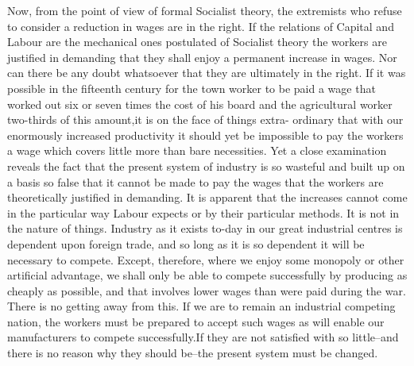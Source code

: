 \documentclass{book}
\begin{document}
Now, from the point of view of formal Socialist theory, the extremists who refuse to consider a reduction in wages are in the right. If the relations of Capital and Labour are the mechanical ones postulated of Socialist theory the workers are justified in demanding that they shall enjoy a permanent increase in wages. Nor can there be any doubt whatsoever that they are ultimately in the right. If it was possible in the fifteenth century for the town worker to be paid a wage that worked out six or seven times the cost of his board and the agricultural worker two-thirds of this amount,\footnotemark[1] it is on the face of things extra- ordinary that with our enormously increased productivity it should yet be impossible to pay the workers a wage which covers little more than bare necessities. Yet a close examination reveals the fact that the present system of industry is so wasteful and built up on a basis so false that it cannot be made to pay the wages that the workers are theoretically justified in demanding. It is apparent that the increases cannot come in the particular way Labour expects or by their particular methods. It is not in the nature of things. Industry as it exists to-day in our great industrial centres is dependent upon foreign trade, and so long as it is so dependent it will be necessary to compete. Except, therefore, where we enjoy some monopoly or other artificial advantage, we shall only be able to compete successfully by producing as cheaply as possible, and that involves lower wages than were paid during the war. There is no getting away from this. If we are to remain an industrial competing nation, the workers must be prepared to accept such wages as will enable our manufacturers to compete successfully.\footnotemark[2] If they are not satisfied with so little–and there is no reason why they should be–the present system must be changed.
\end{document}
